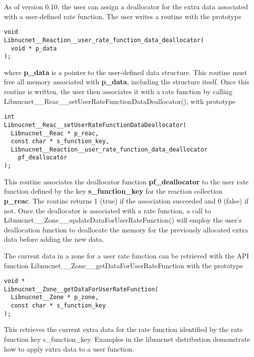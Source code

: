 \documentclass{article}    %
\begin{document}
As of version 0.10, the user can assign a deallocator for the extra
data associated with a user-defined rate function.  The user writes a
routine with the prototype
\begin{verbatim}
void
Libnucnet__Reaction__user_rate_function_data_deallocator(
  void * p_data
);
\end{verbatim}
where {\bf p\_data} is a pointer to the user-defined data structure.  This
routine must free all memory associated with {\bf p\_data}, including the
structure itself.  Once this routine is written, the user then associates
it with a rate function by calling
Libnucnet\_\_Reac\_\_setUserRateFunctionDataDeallocator(), with prototype
\begin{verbatim}
int
Libnucnet__Reac__setUserRateFunctionDataDeallocator(
  Libnucnet__Reac * p_reac,
  const char * s_function_key,
  Libnucnet__Reaction__user_rate_function_data_deallocator
    pf_deallocator
);
\end{verbatim}
This routine associates the deallocator function {\bf pf\_deallocator} to
the user rate function defined by the key {\bf s\_function\_key} for the
reaction collection {\bf p\_reac}.  The routine returns 1 (true) if the
association succeeded and 0 (false) if not.
Once the deallocator is associated with
a rate function, a call to
Libnucnet\_\_Zone\_\_updateDataForUserRateFunction()
will employ the user's deallocation function to deallocate the memory for
the previously allocated extra data before adding the new data.

The current data in a zone for a user rate function can be retrieved
with the API function Libnucnet\_\_Zone\_\_getDataForUserRateFunction
with the prototype
\begin{verbatim}
void *
Libnucnet__Zone__getDataForUserRateFunction(
  Libnucnet__Zone * p_zone,
  const char * s_function_key
);
\end{verbatim}
This retrieves the current extra data for the rate function identified by
the rate function key s\_function\_key.  Examples in the libnucnet distribution
demonstrate how to apply extra data to a user function.
\end{document}
